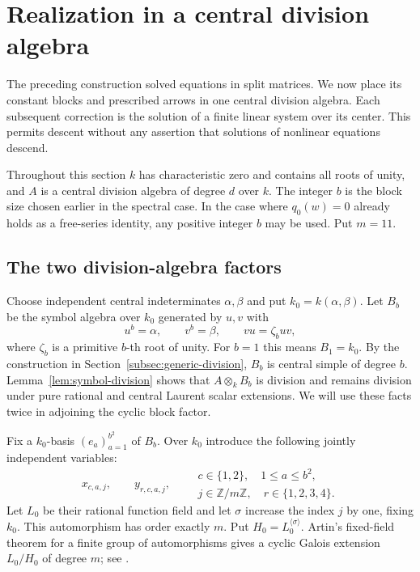 \section{Realization in a central division algebra}
\label{sec:division-realization}

The preceding construction solved equations in split matrices.  We now
place its constant blocks and prescribed arrows in one central division
algebra.  Each subsequent correction is the solution of a finite linear
system over its center.  This permits descent without any assertion that
solutions of nonlinear equations descend.

Throughout this section $k$ has characteristic zero and contains all roots
of unity, and $A$ is a central division algebra of degree $d$ over $k$.
The integer $b$ is the block size chosen earlier in the spectral case.
In the case where $q_0(w)=0$ already holds as a free-series identity, any
positive integer $b$ may be used.  Put $m=11$.

\subsection{The two division-algebra factors}

Choose independent central indeterminates $\alpha,\beta$ and put
$k_0=k(\alpha,\beta)$.  Let $B_b$ be the symbol algebra over $k_0$
generated by $u,v$ with
\[
 u^b=\alpha,\qquad v^b=\beta,\qquad vu=\zeta_buv,
\]
where $\zeta_b$ is a primitive $b$-th root of unity.  For $b=1$ this
means $B_1=k_0$.  By the construction in Section~\ref{subsec:generic-division}, $B_b$
is central simple of degree $b$.  Lemma~\ref{lem:symbol-division}
shows that $A\otimes_k B_b$ is division and remains division under
pure rational and central Laurent scalar extensions.  We will use
these facts twice in adjoining the cyclic block factor.

Fix a $k_0$-basis $(e_a)_{a=1}^{b^2}$ of $B_b$.  Over $k_0$ introduce
the following jointly independent variables:
\[
 x_{c,a,j},\qquad y_{r,c,a,j},
 \qquad
 \begin{matrix}
 c\in\{1,2\},\quad 1\le a\le b^2,\\
 j\in\mathbb Z/m\mathbb Z,\quad r\in\{1,2,3,4\}.
 \end{matrix}
\]
Let $L_0$ be their rational function field and let $\sigma$ increase
the index $j$ by one, fixing $k_0$.  This automorphism has order exactly
$m$.  Put $H_0=L_0^{\langle\sigma\rangle}$.  Artin's fixed-field theorem
for a finite group of automorphisms gives a cyclic Galois extension
$L_0/H_0$ of degree $m$; see \cite[Corollary~3.11, p.~38]{MilneFT2022}.

